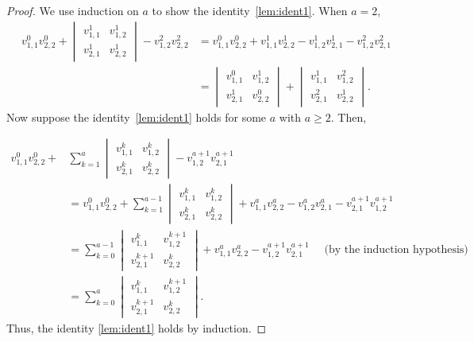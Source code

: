 \documentclass[11pt]{amsart}
\theoremstyle{remark}
\theoremstyle{remark}
\theoremstyle{definition}
\theoremstyle{definition}
\theoremstyle{definition}
\numberwithin{equation}{section}
\begin{document}
\begin{proof} We use induction on $a$ to show the identity~\eqref{lem:ident1}. When $a=2$,
\begin{align*}
        v_{1,1}^0v_{2,2}^0+\begin{vmatrix}
        v_{1,1}^1&v_{1,2}^1\\
        v_{2,1}^1&v_{2,2}^1
    \end{vmatrix}-v_{1,2}^2v_{2,2}^2&=v_{1,1}^0v_{2,2}^0+v_{1,1}^1v_{2,2}^1-v_{1,2}^1v_{2,1}^1-v_{1,2}^2v_{2,1}^2\\
    &=\begin{vmatrix}
         v_{1,1}^0&v_{1,2}^1\\
        v_{2,1}^1&v_{2,2}^0
    \end{vmatrix}+\begin{vmatrix}
         v_{1,1}^1&v_{1,2}^2\\
        v_{2,1}^2&v_{2,2}^1
    \end{vmatrix}.
\end{align*}
Now suppose the identity~\eqref{lem:ident1} holds for some $a$ with $a\geq 2$. Then,

\begin{align*}
v_{1,1}^0v_{2,2}^0+&\sum_{k=1}^a\begin{vmatrix}
        v_{1,1}^k&v_{1,2}^k\\
        v_{2,1}^k&v_{2,2}^k
    \end{vmatrix}-v_{1,2}^{a+1}v_{2,1}^{a+1}\\
&= v_{1,1}^0v_{2,2}^0+\sum_{k=1}^{a-1}\begin{vmatrix} v_{1,1}^k&v_{1,2}^k\\ v_{2,1}^k&v_{2,2}^k \end{vmatrix} + v_{1,1}^av_{2,2}^a-v_{1,2}^av_{2,1}^a - v_{2,1}^{a+1}v_{1,2}^{a+1} \\
&=\sum_{k=0}^{a-1}\begin{vmatrix}
        v_{1,1}^k&v_{1,2}^{k+1}\\
        v_{2,1}^{k+1}&v_{2,2}^k
    \end{vmatrix}+v_{1,1}^av_{2,2}^a-v_{1,2}^{a+1}v_{2,1}^{a+1} \quad \text{ (by the induction hypothesis)}\\
    &=\displaystyle\sum_{k=0}^{a}\begin{vmatrix}
        v_{1,1}^k&v_{1,2}^{k+1}\\
        v_{2,1}^{k+1}&v_{2,2}^k
    \end{vmatrix}.\end{align*}
Thus, the identity \eqref{lem:ident1} holds by induction. 
\end{proof}
\end{document}
